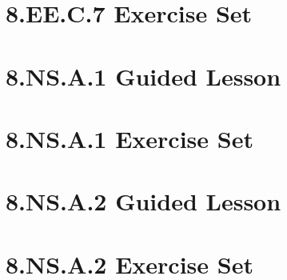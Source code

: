 \documentclass[a4paper,12pt]{article}
\begin{document}
\newpage
\section{8.EE.C.7 Exercise Set}


\newpage
\section{8.NS.A.1 Guided Lesson}


\newpage
\section{8.NS.A.1 Exercise Set}


\newpage
\section{8.NS.A.2 Guided Lesson}


\newpage
\section{8.NS.A.2 Exercise Set}

\end{document}
